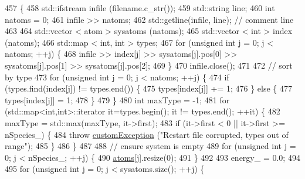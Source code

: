 \begin{DoxyCode}
457                                                \{
458                 std::ifstream infile (filename.c\_str());
459                 std::string line;
460                 \textcolor{keywordtype}{int} natoms = 0;
461                 infile >> natoms;
462                 std::getline(infile, line); \textcolor{comment}{// comment line }
463                 
464                 std::vector < atom > sysatoms (natoms);
465                 std::vector < int > index (natoms);
466                 std::map < int, int > types;
467                 \textcolor{keywordflow}{for} (\textcolor{keywordtype}{unsigned} \textcolor{keywordtype}{int} j = 0; j < natoms; ++j) \{
468         infile >> index[j] >> sysatoms[j].pos[0] >> sysatoms[j].pos[1] >> sysatoms[j].pos[2];
469     \}
470                 infile.close();
471                 
472                 \textcolor{comment}{// sort by type}
473                 \textcolor{keywordflow}{for} (\textcolor{keywordtype}{unsigned} \textcolor{keywordtype}{int} j = 0; j < natoms; ++j) \{
474                                 \textcolor{keywordflow}{if} (types.find(index[j]) != types.end()) \{
475                                                 types[index[j]] += 1;
476                                 \} \textcolor{keywordflow}{else} \{
477                                                 types[index[j]] = 1;
478                                 \}
479                 \}
480                 \textcolor{keywordtype}{int} maxType = -1;
481                 \textcolor{keywordflow}{for} (std::map<int,int>::iterator it=types.begin(); it != types.end(); ++it) \{
482                                 maxType = std::max(maxType, it->first);
483                                 \textcolor{keywordflow}{if} (it->first < 0 || it->first >= nSpecies\_) \{
484                                                 \textcolor{keywordflow}{throw} \hyperlink{classcustom_exception}{customException} (\textcolor{stringliteral}{"Restart file
       corrupted, types out of range"});
485                                 \}
486                 \}
487                 
488                 \textcolor{comment}{// ensure system is empty}
489                 \textcolor{keywordflow}{for} (\textcolor{keywordtype}{unsigned} \textcolor{keywordtype}{int} j = 0; j < nSpecies\_; ++j) \{
490                                 \hyperlink{classsim_system_a90421b19082f7fb8fc23b7264b1161e4}{atoms}[j].resize(0);
491                 \}
492                 
493                 energy\_ = 0.0;
494                 
495                 \textcolor{keywordflow}{for} (\textcolor{keywordtype}{unsigned} \textcolor{keywordtype}{int} j = 0; j < sysatoms.size(); ++j) \{

\end{DoxyCode}
